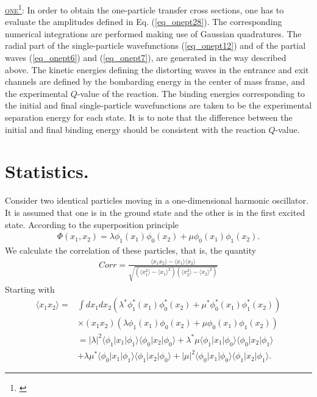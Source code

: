 \begin{subappendices}
\underline{\textsc{one}}\footnote{\cite{Potel:12b}}: In order to obtain the  one-particle transfer cross sections, one has to evaluate  the amplitudes defined in Eq. (\ref{eq_onept28}). The corresponding numerical integrations are   performed making use of Gaussian quadratures. The radial part of the single-particle  wavefunctions (\ref{eq_onept12}) and of the partial waves (\ref{eq_onept6}) and (\ref{eq_onept7}), are generated in the way described above. The kinetic energies defining the distorting waves in the entrance and exit channels are defined by the bombarding energy in the center of mass frame, and the experimental $Q$-value of the reaction. The binding energies corresponding to the initial and final single-particle wavefunctions are taken to be the experimental separation energy for each state. It is to note that the difference between the initial and final binding energy should be consistent with the reaction $Q$-value.  



   

\section{Statistics.}\label{App6D}
Consider two identical particles moving in a one-dimensional harmonic oscillator. It is assumed  that one is in the ground state and the other  is in the first excited state. According to the superposition principle 
\begin{align}\label{eqApp6G1}
\Phi(x_1,x_2)=\lambda\phi_1(x_1)\phi_0(x_2)+\mu\phi_0(x_1)\phi_1(x_2).
\end{align} 
We calculate the correlation of these particles, that is, the quantity
\begin{align}\label{eqApp6G2}
Corr=\frac{\langle x_1x_2\rangle-\langle x_1\rangle\langle x_2\rangle}{\sqrt{\left(\langle x_1^2\rangle-\langle x_1\rangle^2\right)\left(\langle x_2^2\rangle-\langle x_2\rangle^2\right)}}
\end{align} 
Starting with
\begin{align}\label{eqApp63}
\nonumber\langle x_1x_2\rangle=&\int dx_1 dx_2 \left(\lambda^*\phi_1^*(x_1)\phi_0^*(x_2)+\mu^*\phi_0^*(x_1)\phi_1^*(x_2)\right)\\
\nonumber&\times(x_1 x_2)\left(\lambda\phi_1(x_1)\phi_0(x_2)+\mu\phi_0(x_1)\phi_1(x_2)\right)\\
\nonumber &=|\lambda|^2\langle\phi_1|x_1|\phi_1\rangle\langle\phi_0|x_2|\phi_0\rangle+\lambda^*\mu\langle\phi_1|x_1|\phi_0\rangle\langle\phi_0|x_2|\phi_1\rangle\\
&+\lambda\mu^*\langle\phi_0|x_1|\phi_1\rangle\langle\phi_1|x_2|\phi_0\rangle+|\mu|^2\langle\phi_0|x_1|\phi_0\rangle\langle\phi_1|x_2|\phi_1\rangle.
\end{align} 


\end{subappendices}
